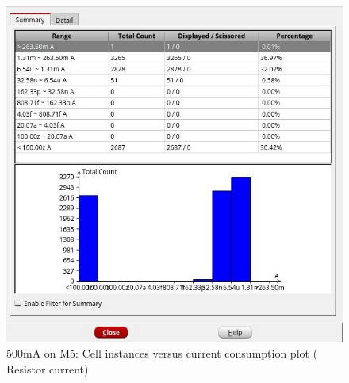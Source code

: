 \documentclass[a4paper]{article}
\begin{document}
\begin{figure}[htbp]
\centering
\includegraphics[width=.9\linewidth]{./img/era5.jpg}
\caption{\label{fig:orgd483690}500mA on M5: Cell instances versus current consumption plot ( Resistor current)}
\end{figure}
\end{document}
